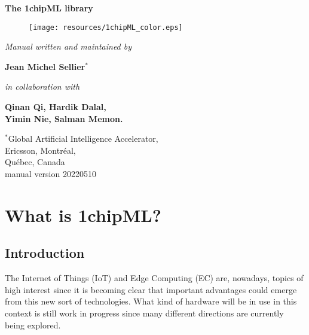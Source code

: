 \documentclass{book}
\begin{document}
\begin{titlepage}
\begin{center}

\begin{spacing}{2.5}
\textbf{\huge The 1chipML library}\\[0.5cm]

\begin{figure}[h]
\centering
\texttt{[image: resources/1chipML\_color.eps]}
\end{figure}

\vspace*{\fill}
\textit{Manual written and maintained by}
\end{spacing}

\begin{spacing}{1.15}
\textbf{\large Jean Michel Sellier$^*$}
\vspace*{\fill}
\end{spacing}

\begin{spacing}{1.15}
\textit{\large in collaboration with}

\textbf{Qinan Qi, Hardik Dalal,\\Yimin Nie, Salman Memon.}

\vspace*{\fill}

\textnormal{\large $^*$Global Artificial Intelligence Accelerator,\\ Ericsson, Montr\'{e}al,\\Qu\'{e}bec, Canada\\ \bigskip manual version 20220510}

\end{spacing}
\end{center}
\end{titlepage}

\tableofcontents

\chapter{What is 1chipML?}

\section{Introduction}

The Internet of Things (IoT) and Edge Computing (EC) are, nowadays, topics of high interest since
it is becoming clear that important advantages could emerge from this new sort of    technologies.
What kind of hardware will be in use in this context is still work in progress         since many
different directions are currently being explored.
\end{document}
